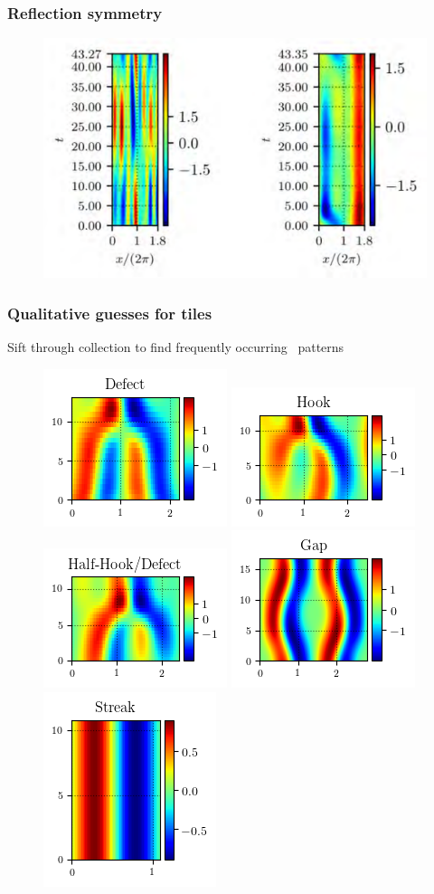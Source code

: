 \documentclass[mathserif, handout]{beamer}
\begin{document}
\begin{frame}%
  \frametitle{Reflection symmetry}
  \begin{figure}
  \includegraphics[width=.9\textwidth]{ANTI_IF}
  \end{figure}
\end{frame}

\begin{frame}%
  \frametitle{Qualitative guesses for tiles}
  Sift through collection to find frequently occurring \spt\ patterns
  \begin{figure}
  \includegraphics[width=.2\textwidth]{MNG_defect}
  \includegraphics[width=.2\textwidth]{MNG_hook}
  \includegraphics[width=.2\textwidth]{MNG_half}
  \includegraphics[width=.2\textwidth]{MNG_gap}
  \includegraphics[width=.2\textwidth]{MNG_streak}
  \end{figure}
\end{frame}
\end{document}
